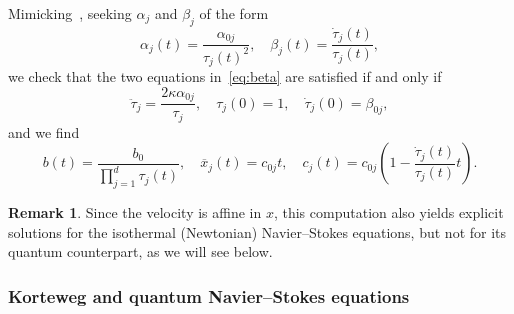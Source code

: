 \documentclass[11pt]{article}
\theoremstyle{definition}
\newtheorem{rema}[theo]{Remark}
\numberwithin{equation}{section}
\numberwithin{figure}{section}
\numberwithin{table}{section}
\newcommand*\<{\left\langle}
\renewcommand*\>{\right\rangle}
\begin{document}
Mimicking~\cite{LiWa06}, seeking $\alpha_j$ and $\beta_j$ of the form
\begin{equation*}
\alpha_j(t) =\frac{\alpha_{0j}}{\tau_j(t)^2},\quad \beta_j(t) =
\frac{\dot \tau_j(t)}{\tau_j(t)},
\end{equation*}
we check that the two equations in~\eqref{eq:beta} are satisfied if and only if
\begin{equation}\label{eq:tauj}
\ddot \tau_j =
\frac{2\kappa \alpha_{0j}}{\tau_j},\quad
\tau_j(0)=1,\quad \dot \tau_j(0)=\beta_{0j},
\end{equation}
and we find
\begin{equation*}
b(t)=\frac{b_0}{\prod_{j=1}^d \tau_j(t)},\quad
\overline x_j(t)= c_{0j}t,\quad c_j(t) =c_{0j}\left(1-\frac{\dot
\tau_j(t)}{\tau_j(t)}t\right).
\end{equation*}
\begin{rema}
Since the velocity is affine in $x$, this computation also yields explicit solutions for the isothermal (Newtonian) Navier--Stokes equations, but not for its quantum counterpart, as we will see below.
\end{rema}

\subsubsection{Korteweg and quantum Navier--Stokes equations}
\end{document}
